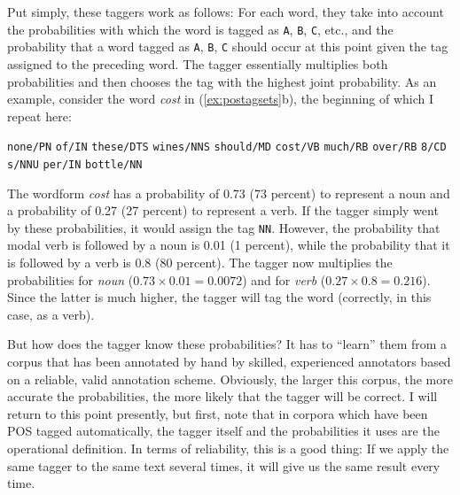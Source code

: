 Put simply, these taggers work as follows: For each word, they take into account the probabilities with which the word is tagged as \texttt{A}, \texttt{B}, \texttt{C}, etc., and the probability that a word tagged as \texttt{A}, \texttt{B}, \texttt{C} should occur at this point given the tag assigned to the preceding word. The tagger essentially multiplies both probabilities and then chooses the tag with the highest joint probability. As an example, consider the word \textit{cost} in (\ref{ex:postagsets}b), the beginning of which I repeat here:

\begin{exe}
\ex \begin{minipage}[t]{0.85\textwidth} \raggedright  \texttt{none/PN} \texttt{of/IN} \texttt{these/DTS} \texttt{wines/NNS} \texttt{should/MD} \texttt{cost/VB} \texttt{much/RB} \texttt{over/RB} \texttt{8/CD} \texttt{s/NNU} \texttt{per/IN} \texttt{bottle/NN} \end{minipage}
\label{ex:shouldcost}
\end{exe}

The wordform \textit{cost} has a probability of 0.73 (73 percent) to represent a noun and a probability of 0.27 (27 percent) to represent a verb. If the tagger simply went by these probabilities, it would assign the tag \texttt{NN}. However, the probability that modal verb is followed by a noun is 0.01 (1 percent), while the probability that it is followed by a verb is 0.8 (80 percent). The tagger now multiplies the probabilities for \textit{noun} ($0.73 \times 0.01 = 0.0072$) and for \textit{verb} ($0.27 \times 0.8 = 0.216$). Since the latter is much higher, the tagger will tag the word (correctly, in this case, as a verb).

But how does the tagger know these probabilities? It has to ``learn'' them from a corpus that has been annotated by hand by skilled, experienced annotators based on a reliable, valid annotation scheme. Obviously, the larger this corpus, the more accurate the probabilities, the more likely that the tagger will be correct. I will return to this point presently, but first, note that in corpora which have been POS tagged automatically, the tagger itself and the probabilities it uses are the operational definition. In terms of reliability, this is a good thing: If we apply the same tagger to the same text several times, it will give us the same result every time.


